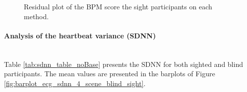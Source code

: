\begin{figure}[!htb]
\begin{minipage}{0.45\textwidth}
        \caption{Residual plot of the BPM score the sight participants on each method.}
        \label{fig:residplot_bpm_two_way_sight}
    \end{minipage}
\end{figure}

%



\FloatBarrier

%
%
\paragraph{Analysis of the heartbeat variance (SDNN)}\mbox{}\\
%

Table \ref{tab:sdnn_table_noBase} presents the SDNN for both sighted and blind participants. The mean values are presented in the barplots of Figure \ref{fig:barplot_ecg_sdnn_4_scene_blind_sight}.



